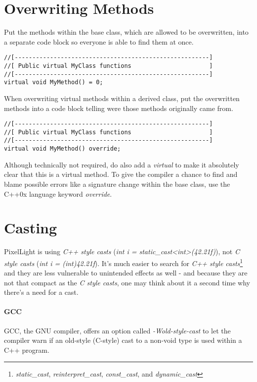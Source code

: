 \section{Overwriting Methods}
Put the methods within the base class, which are allowed to be overwritten, into a separate code block so everyone is able to find them at once.
\begin{lstlisting}[caption=Virtual methods within a base class]
//[-------------------------------------------------------]
//[ Public virtual MyClass functions                      ]
//[-------------------------------------------------------]
virtual void MyMethod() = 0;
\end{lstlisting}

When overwriting virtual methods within a derived class, put the overwritten methods into a code block telling were those methods originally came from.
\begin{lstlisting}[caption=Overwriting virtual methods within a derived class]
//[-------------------------------------------------------]
//[ Public virtual MyClass functions                      ]
//[-------------------------------------------------------]
virtual void MyMethod() override;
\end{lstlisting}
Although technically not required, do also add a \emph{virtual} to make it absolutely clear that this is a virtual method. To give the compiler a chance to find and blame possible errors like a signature change within the base class, use the C++0x language keyword \emph{override}.




\section{Casting}
PixelLight is using \emph{C++ style casts} (\emph{int i = static\_cast<int>(42.21f)}), not \emph{C style casts} (\emph{int i = (int)42.21f}). It's much easier to search for \emph{C++ style casts}\footnote{\emph{static\_cast}, \emph{reinterpret\_cast}, \emph{const\_cast}, and \emph{dynamic\_cast}} and they are less vulnerable to unintended effects as well - and because they are not that compact as the \emph{C style casts}, one may think about it a second time why there's a need for a cast.

\paragraph{GCC}
GCC, the GNU compiler, offers an option called \emph{-Wold-style-cast} to let the compiler warn if an old-style (C-style) cast to a non-void type is used within a C++ program.




